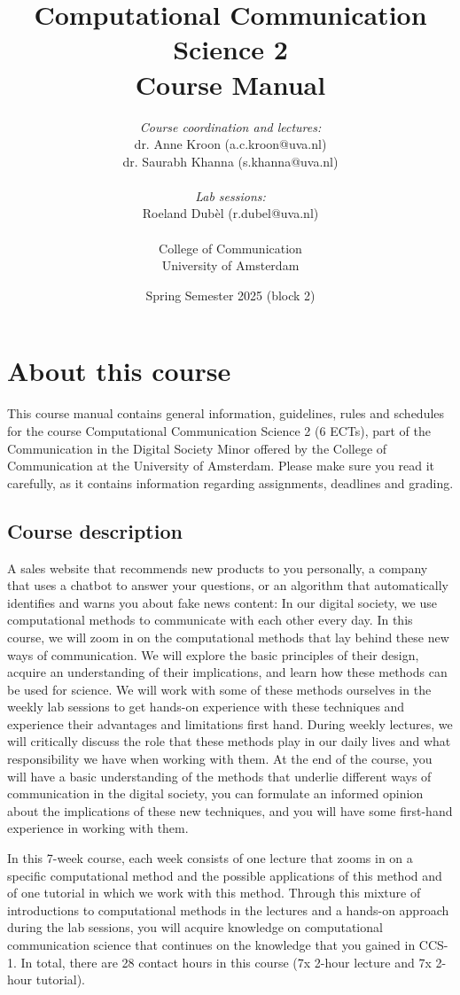\documentclass[a4paper,10pt]{report}
\title{Computational Communication Science 2\\ Course Manual}
\author{\emph{Course coordination and lectures:}\\ dr. Anne Kroon (a.c.kroon@uva.nl)\\dr. Saurabh Khanna (s.khanna@uva.nl) \\ \\ \emph{Lab sessions:}  \\ Roeland Dubèl (r.dubel@uva.nl)\\~\\College of Communication\\University of Amsterdam}
\date{Spring Semester 2025 (block 2)}
\begin{document}
	\maketitle
	
	\tableofcontents

	
	\chapter{About this course}
	
	This course manual contains general information, guidelines, rules and schedules for the course Computational Communication Science 2 (6 ECTs), part of the Communication in the Digital Society Minor offered by the College of Communication at the University of Amsterdam. Please make sure you read it carefully, as it  contains information regarding assignments, deadlines and grading.
	
	\section{Course description}
	
	A sales website that recommends new products to you personally, a company that uses a chatbot to answer your questions, or an algorithm that automatically identifies and warns you about fake news content: In our digital society, we use computational methods to communicate with each other every day. In this course, we will zoom in on the computational methods that lay behind these new ways of communication. We will explore the basic principles of their design, acquire an understanding of their implications, and learn how these methods can be used for science. We will work with some of these methods ourselves in the weekly lab sessions to get hands-on experience with these techniques and experience their advantages and limitations first hand. During weekly lectures, we will critically discuss the role that these methods play in our daily lives and what responsibility we have when working with them. At the end of the course, you will have a basic understanding of the methods that underlie different ways of communication in the digital society, you can formulate an informed opinion about the implications of these new techniques, and you will have some first-hand experience in working with them.
	
	In this 7-week course, each week consists of one lecture that zooms in on a specific computational method and the possible applications of this method and of one tutorial in which we work with this method. Through this mixture of introductions to computational methods in the lectures and a hands-on approach during the lab sessions, you will acquire knowledge on computational communication science that continues on the knowledge that you gained in CCS-1. In total, there are 28 contact hours in this course (7x 2-hour lecture and 7x 2-hour tutorial). 
	
\end{document}
